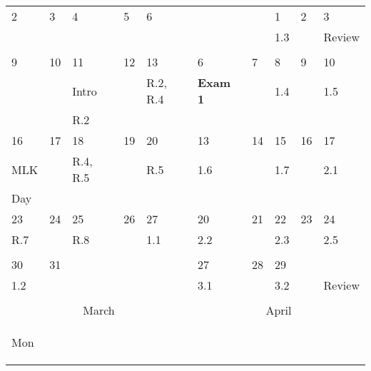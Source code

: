 \begin{center}
\begin{small}
\begin{tabular}{||l|l|l|l|l||l|l|l|l|l||}
\hline
\tiny{2}& \tiny{3} & \tiny{4} & \tiny{5} & \tiny{6} & \tiny{} & \tiny{} & \tiny{1}  & \tiny{2} & \tiny{3} \\
        &          &          &        &          & &          &\tiny{1.3} &          & \tiny{ Review}      \\
        &          &             &        &          & &          &           &          &          \\
\hline
\tiny{9}&\tiny{10} & \tiny{11} & \tiny{12} & \tiny{13} & \tiny{6} & \tiny{7} & \tiny{8}  & \tiny{9} & \tiny{10} \\
        &            &\tiny{Intro} &       & \tiny{R.2, R.4}   & \tiny{\bf Exam 1}     &     & \tiny{1.4} &         & \tiny{ 1.5}        \\
        &            & \tiny{R.2}     &          &          & &                     &          &          &          \\
\hline
\tiny{16} & \tiny{17} & \tiny{18} & \tiny{19} & \tiny{20} & \tiny{13} & \tiny{14} & \tiny{15}  & \tiny{16} & \tiny{17}  \\
\tiny{MLK} &        &\tiny{R.4, R.5}  &       &  \tiny{R.5} & \tiny{1.6} &        & \tiny{1.7}   &         &\tiny{ 2.1}            \\
\tiny{Day} &                       &          &            &       & &              &          &           &       \\
\hline
\tiny{23} & \tiny{24} & \tiny{25} & \tiny{26} & \tiny{27} & \tiny{20} & \tiny{21} & \tiny{22}  & \tiny{23} & \tiny{24} \\
\tiny{R.7} &       &\tiny{R.8} &           &\tiny{ 1.1}  & \tiny{2.2} &       &\tiny{2.3}       &        & \tiny{ 2.5}      \\
        &                     &          &            &       & &                    &          &             &      \\
\hline
\tiny{30} & \tiny{31} & \tiny{} & \tiny{} & \tiny{} & \tiny{27} & \tiny{28} & \tiny{29}  & \tiny{} & \tiny{} \\
\tiny{1.2} &           &       &         &       & \tiny{3.1}   &          &\tiny{3.2} &         & \tiny{ Review}    \\
        &          &          &        &     & &          &          &          &          \\
\hline
\multicolumn{5}{||c||}{March}&\multicolumn{5}{c||}{April}\\
\hline
\begin{minipage}{1cm}{\begin{center}Mon\end{center}}\end{minipage}&

\end{tabular}
\end{small}
\end{center}
